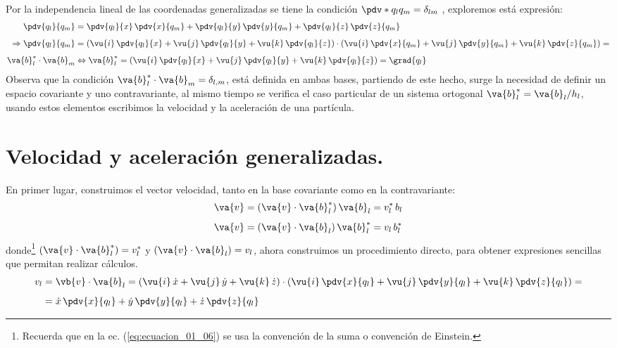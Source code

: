 \par
Por la independencia lineal de las coordenadas generalizadas se tiene la condición $\pdv*{q_{l}}{q_{m}} = \delta_{l m}$ , exploremos está expresión:
\begin{align}
\begin{aligned}
\pdv{q_{l}}{q_{m}} &= \pdv{q_{l}}{x} \, \pdv{x}{q_{m}} + \pdv{q_{l}}{y} \, \pdv{y}{q_{m}} + \pdv{q_{l}}{z} \, \pdv{z}{q_{m}} \\[0.5em]
\Rightarrow \pdv{q_{l}}{q_{m}} &= \left( \vu{i} \, \pdv{q_{l}}{x} + \vu{j} \, \pdv{q_{l}}{y} + \vu{k} \, \pdv{q_{l}}{z} \right) \cdot \left( \vu{i} \, \pdv{x}{q_{m}} + \vu{j} \, \pdv{y}{q_{m}} + \vu{k} \, \pdv{z}{q_{m}} \right) = \\[0.5em]
\va{b}_{l}^{*} \cdot \va{b}_{m} &\Leftrightarrow \va{b}_{l}^{*} = \left( \vu{i} \, \pdv{q_{l}}{x} + \vu{j} \, \pdv{q_{l}}{y} + \vu{k} \, \pdv{q_{l}}{z} \right) = \grad{q_{l}}
\end{aligned}
\label{eq:ecuacion_01_05}
\end{align}
Observa que la condición $\va{b}_{l}^{*} \cdot \va{b}_{m} = \delta_{l, m}$, está definida en ambas bases, partiendo de este hecho, surge la necesidad de definir un espacio covariante y uno contravariante, al mismo tiempo se verifica el caso particular de un sistema ortogonal $\va{b}_{l}^{*} = \va{b}_{l} / h_{l}$, usando estos elementos escribimos la velocidad y la aceleración de una partícula.

\section{Velocidad y aceleración generalizadas.}

En primer lugar, construimos el vector velocidad, tanto en la base covariante como en la contravariante:
\begin{align}
\begin{aligned}
\va{v} &= (\va{v} \cdot \va{b}_{l}^{*}) \, \va{b}_{l} = v_{l}^{*} \, b_{l} \\[0.5em]
\va{v} &= (\va{v} \cdot \va{b}_{l}) \, \va{b}_{l}^{*} = v_{l} \, b_{l}^{*}
\end{aligned}
\label{eq:ecuacion_01_06}
\end{align}
donde\footnote{Recuerda que en la ec. (\ref{eq:ecuacion_01_06}) se usa la convención de la suma o convención de Einstein.} $(\va{v} \cdot \va{b}_{l}^{*}) = v_{l}^{*} $ y $(\va{v} \cdot \va{b}_{l}) = v_{l}$, ahora construimos un procedimiento directo, para obtener expresiones sencillas que permitan realizar cálculos.
\begin{align}
\begin{aligned}
v_{l} &= \vb{v} \cdot \va{b}_{l} = (\vu{i} \, \dot{x} + \vu{j} \, \dot{y} + \vu{k} \, \dot{z}) \cdot \left( \vu{i} \, \pdv{x}{q_{l}} + \vu{j} \, \pdv{y}{q_{l}} + \vu{k} \, \pdv{z}{q_{l}}\right) = \\[0.5em]
&= \dot{x} \, \pdv{x}{q_{l}} + \dot{y} \, \pdv{y}{q_{l}} + \dot{z} \, \pdv{z}{q_{l}}
\end{aligned}
\label{eq:ecuacion_01_07}
\end{align}

